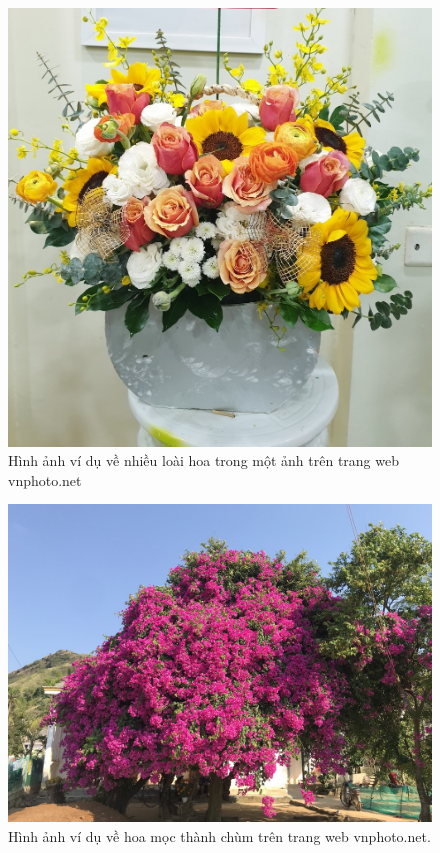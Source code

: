 \documentclass[12pt]{report}
\begin{document}
		\begin{figure}[h]
			\centering
			\includegraphics[scale=0.3]{anhlanghoa}
			\caption{Hình ảnh ví dụ về nhiều loài hoa trong một ảnh trên trang web vnphoto.net}
			\label{fig:app_comment}
		\end{figure}
		\begin{figure}[h]
			\centering
			\includegraphics[scale=0.25]{anh_hoa_giay}
			\caption{Hình ảnh ví dụ về hoa mọc thành chùm trên trang web vnphoto.net.}
			\label{fig:app_comment}
		\end{figure}
\end{document}
